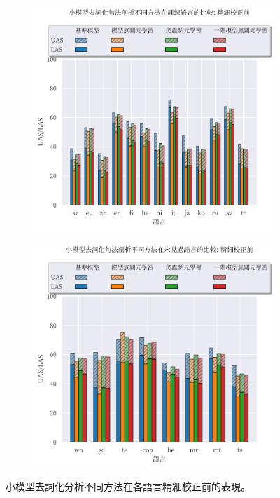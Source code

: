 \begin{figure}[htbp]
    \centering
    \begin{subfigure}[t]{0.8\textwidth}
        \centering
        \includegraphics[width=\textwidth]{figs/chapter3/delex/bar_small_zs_train_langs.pdf}
    \end{subfigure}
    \vspace{-12pt}
    \begin{subfigure}[t]{0.8\textwidth}
        \centering
        \includegraphics[width=\textwidth]{figs/chapter3/delex/bar_small_zs_test_langs.pdf}
    \end{subfigure}
    \caption{小模型去詞化分析不同方法在各語言精細校正前的表現。}
    \label{fig:bar_small_zs}
\end{figure}